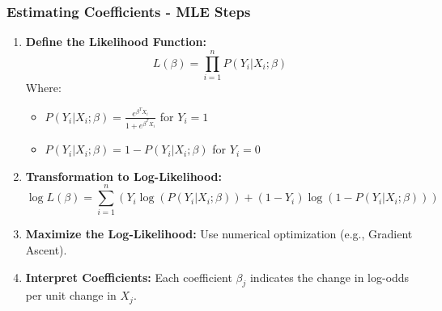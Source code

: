 \documentclass[aspectratio=169]{beamer}
\begin{document}
\begin{frame}[fragile]
    \frametitle{Estimating Coefficients - MLE Steps}
    \begin{enumerate}
        \item \textbf{Define the Likelihood Function:}
            \begin{equation}
                L(\beta) = \prod_{i=1}^{n} P(Y_i | X_i; \beta)
            \end{equation}
            Where:
            \begin{itemize}
                \item \( P(Y_i | X_i; \beta) = \frac{e^{\beta^T X_i}}{1 + e^{\beta^T X_i}} \) for \( Y_i = 1 \)
                \item \( P(Y_i | X_i; \beta) = 1 - P(Y_i | X_i; \beta) \) for \( Y_i = 0 \)
            \end{itemize}
        
        \item \textbf{Transformation to Log-Likelihood:}
            \begin{equation}
                \log L(\beta) = \sum_{i=1}^{n} \left( Y_i \log(P(Y_i | X_i; \beta)) + (1 - Y_i) \log(1 - P(Y_i | X_i; \beta)) \right)
            \end{equation}
        
        \item \textbf{Maximize the Log-Likelihood:} Use numerical optimization (e.g., Gradient Ascent).
        
        \item \textbf{Interpret Coefficients:} Each coefficient \( \beta_j \) indicates the change in log-odds per unit change in \( X_j \).
    \end{enumerate}
\end{frame}
\end{document}
